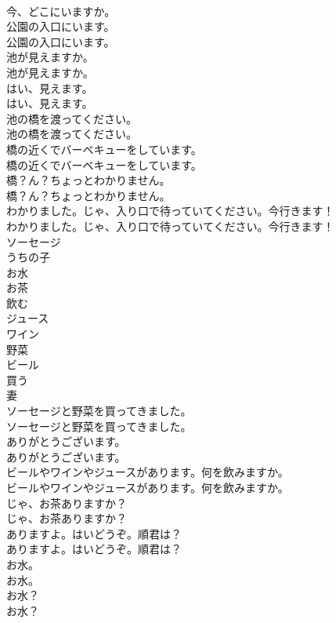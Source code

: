 \documentclass[8pt]{extreport}
\begin{document}
\begin{CJK}{UTF8}{min}
\\	今、どこにいますか。 
\\	公園の入口にいます。	
\\	公園の入口にいます。 
\\	池が見えますか。	
\\	池が見えますか。 
\\	はい、見えます。	
\\	はい、見えます。 
\\	池の橋を渡ってください。	
\\	池の橋を渡ってください。 
\\	橋の近くでバーベキューをしています。	
\\	橋の近くでバーベキューをしています。 
\\	橋？ん？ちょっとわかりません。	
\\	橋？ん？ちょっとわかりません。 
\\	わかりました。じゃ、入り口で待っていてください。今行きます！	
\\	わかりました。じゃ、入り口で待っていてください。今行きます！ 
\\	ソーセージ
\\	うちの子
\\	お水
\\	お茶
\\	飲む
\\	ジュース
\\	ワイン
\\	野菜
\\	ビール
\\	買う
\\	妻
\\	ソーセージと野菜を買ってきました。	
\\	ソーセージと野菜を買ってきました。 
\\	ありがとうございます。	
\\	ありがとうございます。 
\\	ビールやワインやジュースがあります。何を飲みますか。	
\\	ビールやワインやジュースがあります。何を飲みますか。 
\\	じゃ、お茶ありますか？	
\\	じゃ、お茶ありますか？ 
\\	ありますよ。はいどうぞ。順君は？	
\\	ありますよ。はいどうぞ。順君は？ 
\\	お水。	
\\	お水。 
\\	お水？	
\\	お水？ 

\end{CJK}
\end{document}
